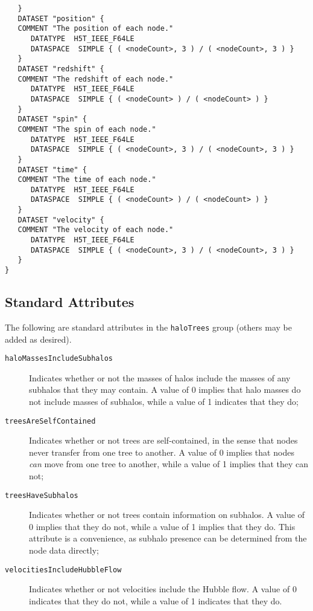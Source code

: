 \begin{verbatim}
   }
   DATASET "position" {
   COMMENT "The position of each node."
      DATATYPE  H5T_IEEE_F64LE
      DATASPACE  SIMPLE { ( <nodeCount>, 3 ) / ( <nodeCount>, 3 ) }
   }
   DATASET "redshift" {
   COMMENT "The redshift of each node."
      DATATYPE  H5T_IEEE_F64LE
      DATASPACE  SIMPLE { ( <nodeCount> ) / ( <nodeCount> ) }
   }
   DATASET "spin" {
   COMMENT "The spin of each node."
      DATATYPE  H5T_IEEE_F64LE
      DATASPACE  SIMPLE { ( <nodeCount>, 3 ) / ( <nodeCount>, 3 ) }
   }
   DATASET "time" {
   COMMENT "The time of each node."
      DATATYPE  H5T_IEEE_F64LE
      DATASPACE  SIMPLE { ( <nodeCount> ) / ( <nodeCount> ) }
   }
   DATASET "velocity" {
   COMMENT "The velocity of each node."
      DATATYPE  H5T_IEEE_F64LE
      DATASPACE  SIMPLE { ( <nodeCount>, 3 ) / ( <nodeCount>, 3 ) }
   }
}
\end{verbatim}

\subsection{Standard Attributes}

The following are standard attributes in the {\tt haloTrees} group (others may be added as desired).

\begin{description}
 \item [{\tt haloMassesIncludeSubhalos}] Indicates whether or not the masses of halos include the masses of any subhalos that they may contain. A value of 0 implies that halo masses do not include masses of subhalos, while a value of 1 indicates that they do;
 \item [{\tt treesAreSelfContained}] Indicates whether or not trees are self-contained, in the sense that nodes never transfer from one tree to another. A value of 0 implies that nodes \emph{can} move from one tree to another, while a value of 1 implies that they can not;
 \item [{\tt treesHaveSubhalos}] Indicates whether or not trees contain information on subhalos. A value of 0 implies that they do not, while a value of 1 implies that they do. This attribute is a convenience, as subhalo presence can be determined from the node data directly;
 \item [{\tt velocitiesIncludeHubbleFlow}] Indicates whether or not velocities include the Hubble flow. A value of 0 indicates that they do not, while a value of 1 indicates that they do.
\end{description}

